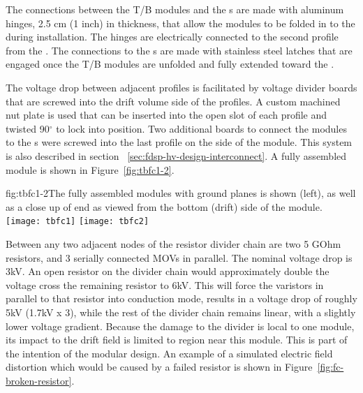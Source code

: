 The connections between the T/B modules and the s are made with aluminum hinges, 2.5 cm (1 inch) in thickness, that allow the modules to be folded in to the  during installation. The hinges are electrically connected to the second profile from the . The connections to the s are made with stainless steel latches that are engaged once the T/B modules are unfolded and fully extended toward the .

The voltage drop between adjacent profiles is facilitated by voltage divider boards that are screwed into the drift volume side of the profiles. A custom machined nut plate is used that can be inserted into the open slot of each profile and twisted 90$^\circ$ to lock into position. Two additional boards to connect the modules to the s were screwed into the last profile on the  side of the module. This system is also described in section ~\ref{sec:fdsp-hv-design-interconnect}. A fully assembled module is shown in Figure~\ref{fig:tbfc1-2}.

\begin{dunefigure}{fig:tbfc1-2}{The fully assembled modules with ground planes is shown (left), as well as a close up of  end as viewed from the bottom (drift) side of the module.}
\texttt{[image: tbfc1]}
\texttt{[image: tbfc2]}
\end{dunefigure}

Between any two adjacent nodes of the resistor divider chain are two 5 GOhm resistors, and 3 serially connected MOVs in parallel.  The nominal voltage drop is 3kV.
An open resistor on the divider chain would approximately double the voltage cross the remaining resistor to 6kV.  This will force the varistors in parallel to that resistor into conduction mode, results in a voltage drop of roughly 5kV (1.7kV x 3), while the rest of the divider chain remains linear, with a slightly lower voltage gradient.
Because the damage to the divider is local to one module, its impact to the  drift field is limited to region near this module.  This is part of the intention of the modular design.
An example of a simulated electric field distortion which would be caused by a failed resistor is shown in Figure~\ref{fig:fc-broken-resistor}. 

